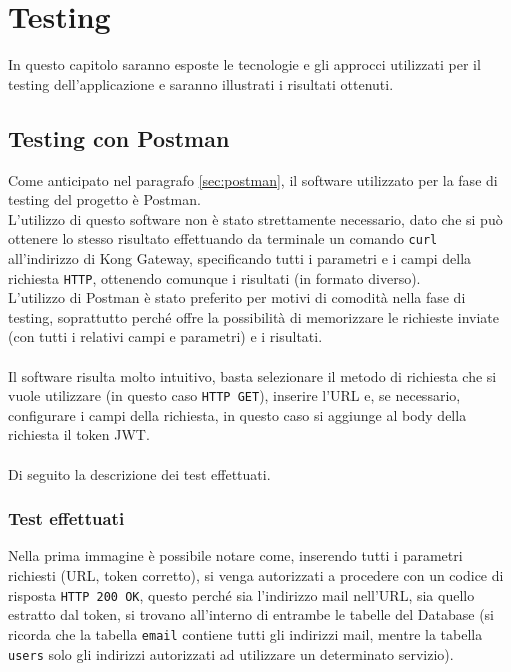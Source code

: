 \chapter{Testing}\label{chap:testing}

In questo capitolo saranno esposte le tecnologie e gli approcci utilizzati per il testing dell'applicazione e saranno illustrati i risultati ottenuti.

\section{Testing con Postman}\label{sec:test1}
Come anticipato nel paragrafo \ref{sec:postman}, il software utilizzato per la fase di testing del progetto è Postman.\\
L'utilizzo di questo software non è stato strettamente necessario, dato che si può ottenere lo stesso risultato effettuando da terminale un comando \texttt{curl}
all'indirizzo di Kong Gateway, specificando tutti i parametri e i campi della richiesta \texttt{HTTP}, ottenendo comunque i risultati (in formato diverso).\\
L'utilizzo di Postman è stato preferito per motivi di comodità nella fase di testing, soprattutto perché offre la possibilità di memorizzare le richieste inviate 
(con tutti i relativi campi e parametri) e i risultati.\\ \\
Il software risulta molto intuitivo, basta selezionare il metodo di richiesta che si vuole utilizzare (in questo caso \texttt{HTTP GET}), 
inserire l'URL e, se necessario, configurare i campi della richiesta, in questo caso si aggiunge al body della richiesta il token JWT. \cite{Postman}\\ \\

Di seguito la descrizione dei test effettuati.\\

\subsection{Test effettuati}\label{subsec:testeffettuati}

Nella prima immagine è possibile notare come, inserendo tutti i parametri richiesti (URL, token corretto), si venga autorizzati a procedere con un codice di risposta
\texttt{HTTP 200 OK}, questo perché sia l'indirizzo mail nell'URL, sia quello estratto dal token, si trovano all'interno di entrambe le tabelle del Database 
(si ricorda che la tabella \texttt{email} contiene tutti gli indirizzi mail, mentre la tabella \texttt{users} solo gli indirizzi autorizzati ad utilizzare un determinato servizio).

